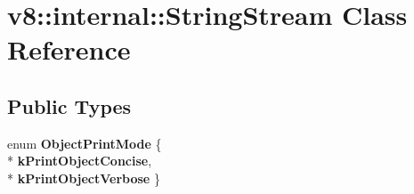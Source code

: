 \hypertarget{classv8_1_1internal_1_1_string_stream}{}\section{v8\+:\+:internal\+:\+:String\+Stream Class Reference}
\label{classv8_1_1internal_1_1_string_stream}
\subsection*{Public Types}
\begin{DoxyCompactItemize}
\item 
enum {\bfseries Object\+Print\+Mode} \{ \\*
{\bfseries k\+Print\+Object\+Concise}, 
\\*
{\bfseries k\+Print\+Object\+Verbose}
 \}\hypertarget{classv8_1_1internal_1_1_string_stream_a361ab644103e5b93e61e9446d097195e}{}\label{classv8_1_1internal_1_1_string_stream_a361ab644103e5b93e61e9446d097195e}

\end{DoxyCompactItemize}

